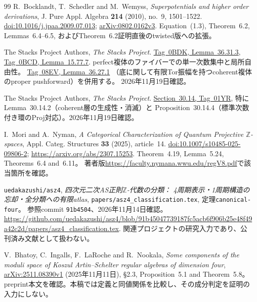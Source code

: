 \documentclass[11pt,a4paper]{ltjsarticle}
\numberwithin{equation}{section}
\begin{document}
\begin{thebibliography}{99}
R.~Bocklandt, T.~Schedler and M.~Wemyss,
\emph{Superpotentials and higher order derivations},
J. Pure Appl. Algebra \textbf{214} (2010), no.~9, 1501--1522.
\href{https://doi.org/10.1016/j.jpaa.2009.07.013}{doi:10.1016/j.jpaa.2009.07.013};
\href{https://arxiv.org/abs/0802.0162v3}{arXiv:0802.0162v3}.
Equation~(1.3), Theorem~6.2, Lemmas~6.4--6.5,
およびTheorem~6.2証明直後のtwisted版への拡張。

The Stacks Project Authors, \emph{The Stacks Project}.
\href{https://stacks.math.columbia.edu/tag/0BDK}{Tag~0BDK, Lemma~36.31.3},
\href{https://stacks.math.columbia.edu/tag/0BCD}{Tag~0BCD, Lemma~15.77.7}.
perfect複体のファイバーでの単一次数集中と局所自由性。
\href{https://stacks.math.columbia.edu/tag/08EV}{Tag~08EV, Lemma~36.27.1}
（底に関して有限Tor振幅を持つcoherent複体のproper pushforward）を併用する。
2026年11月19日確認。

The Stacks Project Authors, \emph{The Stacks Project}.
\href{https://stacks.math.columbia.edu/tag/01YR}{Section~30.14, Tag~01YR},
特にLemma~30.14.2（coherent層の生成性・消滅）と
Proposition~30.14.4（標準次数付き環のProj対応）。2026年11月19日確認。

I.~Mori and A.~Nyman,
\emph{A Categorical Characterization of Quantum Projective $\mathbb Z$-spaces},
Appl. Categ. Structures \textbf{33} (2025), article~14.
\href{https://doi.org/10.1007/s10485-025-09806-2}{doi:10.1007/s10485-025-09806-2};
\url{https://arxiv.org/abs/2307.15253}.
Theorem~4.19, Lemma~5.24, Theorems~6.4 and~6.11。
著者版\url{https://faculty.nymana.wwu.edu/regV8.pdf}で該当箇所を確認。

\texttt{uedakazushi/asz4},
\emph{四次元二次AS正則$\mathbb Z$-代数の分類：
4周期表示・1周期構造の忘却・全分類への有限atlas},
\nolinkurl{papers/asz4_classification.tex}, 定理\texttt{canonical-four}。
参照commit \texttt{91b4504}、2026年11月14日確認。
\url{https://github.com/uedakazushi/asz4/blob/91b45047739187fc5acb6f906b25e48f49a42c2d/papers/asz4_classification.tex}.
関連プロジェクトの研究入力であり、公刊済み文献として扱わない。

V.~Bhatoy, C.~Ingalls, F.~LaRoche and R.~Nookala,
\emph{Some components of the moduli space of Koszul Artin--Schelter regular algebras of dimension four},
\href{https://arxiv.org/abs/2511.08390v1}{arXiv:2511.08390v1}
(2025年11月11日), \S2.3, Proposition~5.1 and Theorem~5.8。
preprint本文を確認。本稿では定義と同値関係を比較し、その成分判定を証明の入力にしない。


\end{thebibliography}
\end{document}
